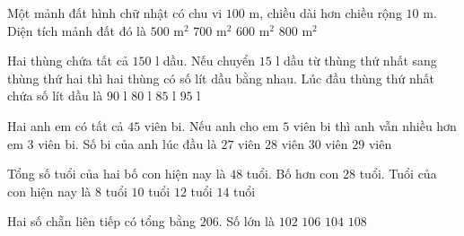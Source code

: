 \begin{ex} %
Một mảnh đất hình chữ nhật có chu vi $100\text{ m}$, chiều dài hơn chiều rộng $10\text{ m}$. Diện tích mảnh đất đó là
\choice
{$500\text{ m}^2$}
{$700\text{ m}^2$}
{\True $600\text{ m}^2$}
{$800\text{ m}^2$}
\end{ex}

\begin{ex} %
Hai thùng chứa tất cả $150\text{ l}$ dầu. Nếu chuyển $15\text{ l}$ dầu từ thùng thứ nhất sang thùng thứ hai thì hai thùng có số lít dầu bằng nhau. Lúc đầu thùng thứ nhất chứa số lít dầu là
\choice
{\True $90\text{ l}$}
{$80\text{ l}$}
{$85\text{ l}$}
{$95\text{ l}$}
\end{ex}

\begin{ex} %
Hai anh em có tất cả $45$ viên bi. Nếu anh cho em $5$ viên bi thì anh vẫn nhiều hơn em $3$ viên bi. Số bi của anh lúc đầu là
\choice
{$27$ viên}
{$28$ viên}
{$30$ viên}
{\True $29$ viên}
\end{ex}

\begin{ex} %
Tổng số tuổi của hai bố con hiện nay là $48$ tuổi. Bố hơn con $28$ tuổi. Tuổi của con hiện nay là
\choice
{$8$ tuổi}
{\True $10$ tuổi}
{$12$ tuổi}
{$14$ tuổi}
\end{ex}

\begin{ex} %
Hai số chẵn liên tiếp có tổng bằng $206$. Số lớn là
\choice
{$102$}
{$106$}
{\True $104$}
{$108$}
\end{ex}

